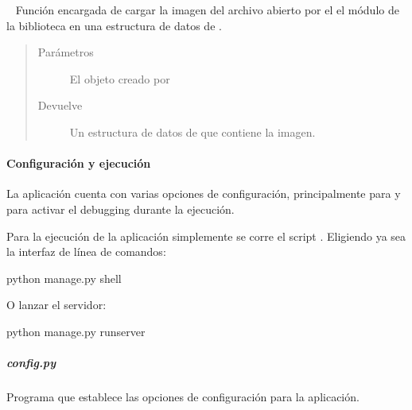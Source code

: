 \begin{fulllineitems}
\label{\detokenize{chapter_two/desc_cloudnao:app.utils.image_utils.load_image_into_numpy_array}}~
Función encargada de cargar la imagen del archivo abierto por el el módulo
 de la biblioteca  en una estructura de datos de .
\begin{quote}\begin{description}
\item[{Parámetros}] \leavevmode
{} \textendash{} El objeto creado por 

\item[{Devuelve}] \leavevmode
Un estructura de datos  de  que contiene la imagen.

\end{description}\end{quote}

\end{fulllineitems}



\paragraph{Configuración y ejecución}
\label{\detokenize{chapter_two/desc_cloudnao:configuracion-y-ejecucion}}
La aplicación cuenta con varias opciones de configuración, principalmente
para  y para activar el debugging durante la ejecución.

Para la ejecución de la aplicación simplemente se corre el
script . Eligiendo ya sea la interfaz de línea de comandos:

\begin{sphinxVerbatim}[commandchars=\\\{\}]
\PYGZdl{} python manage.py shell
\end{sphinxVerbatim}

O lanzar el servidor:

\begin{sphinxVerbatim}[commandchars=\\\{\}]
\PYGZdl{} python manage.py runserver
\end{sphinxVerbatim}


\subparagraph{config.py}
\label{\detokenize{chapter_two/desc_cloudnao:config-py}}\label{\detokenize{chapter_two/desc_cloudnao:module-config}}
Programa que establece las opciones de configuración para la
aplicación.

